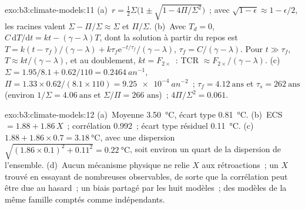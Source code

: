 \begin{solution}{exo:b3:climate-models:11}
(a)~$r = \tfrac12\Sigma\big(1 \pm \sqrt{1 - 4\Pi/\Sigma^2}\big)$~; avec
$\sqrt{1 - \epsilon} \approx 1 - \epsilon/2$, les racines valent $\Sigma -
\Pi/\Sigma \approx \Sigma$ et $\Pi/\Sigma$. (b)~Avec $T_d = 0$, $C\,\mathrm
dT/\mathrm dt = kt - (\gamma - \lambda)T$, dont la solution à partir du repos est $T =
k(t - \tau_f)/(\gamma - \lambda) + k\tau_f\mathrm e^{-t/\tau_f}/(\gamma -
\lambda)$, $\tau_f = C/(\gamma - \lambda)$. Pour $t \gg \tau_f$, $T \approx
kt/(\gamma - \lambda)$, et au doublement, $kt = F_{2\times}$~: TCR
$\approx F_{2\times}/(\gamma - \lambda)$. (c)~$\Sigma = 1.95/8.1 +
0.62/110 = \qty{0.2464}{an^{-1}}$, $\Pi = 1.33\times0.62/(8.1\times110) =
\qty{9.25e-4}{an^{-2}}$~; $\tau_f = \num{4.12}~\text{ans}$ et $\tau_s =
\num{262}~\text{ans}$ (environ $1/\Sigma = \num{4.06}~\text{ans}$ et
$\Sigma/\Pi = \num{266}\text{ ans}$)~; $4\Pi/\Sigma^2 = 0.061$.
\end{solution}

\begin{solution}{exo:b3:climate-models:12}
(a)~Moyenne \qty{3.50}{\celsius}, écart type \qty{0.81}{\celsius}.
(b)~ECS $= 1.88 + 1.86\,X$~; corrélation \num{0.992}~; écart type résiduel
\qty{0.11}{\celsius}. (c)~$1.88 + 1.86\times0.7 =
\qty{3.18}{\celsius}$, avec une dispersion $\sqrt{(1.86\times0.1)^2 + 0.11^2} =
\qty{0.22}{\celsius}$, soit environ un quart de la dispersion de l'ensemble.
(d)~Aucun mécanisme physique ne relie $X$ aux rétroactions~; un $X$ trouvé en
essayant de nombreuses observables, de sorte que la corrélation peut être due au hasard~; un biais
partagé par les huit modèles~; des modèles de la même famille comptés comme
indépendants.
\end{solution}

